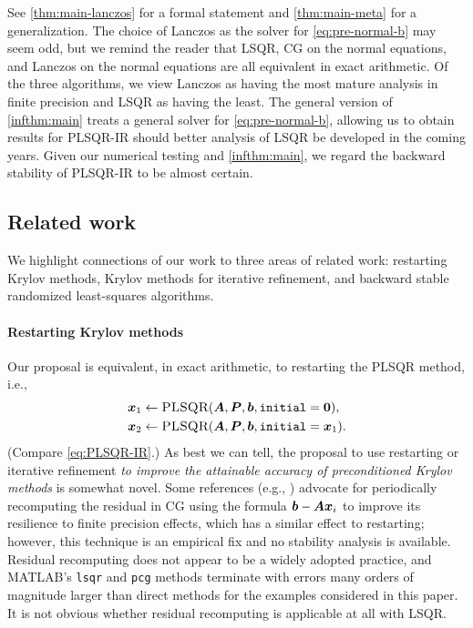 \documentclass[onefignum,onetabnum,pagebackref,dvipsnames]{siamart220329}
\begin{document}
See \cref{thm:main-lanczos} for a formal statement and \cref{thm:main-meta} for a generalization.
The choice of Lanczos as the solver for \cref{eq:pre-normal-b} may seem odd, but we remind the reader that LSQR, CG on the normal equations, and Lanczos on the normal equations are all equivalent in exact arithmetic.
Of the three algorithms, we view Lanczos as having the most mature analysis in finite precision and LSQR as having the least.
The general version of \cref{infthm:main} treats a general solver for \cref{eq:pre-normal-b}, allowing us to obtain results for PLSQR-IR should better analysis of LSQR be developed in the coming years.
Given our numerical testing and \cref{infthm:main}, we regard the backward stability of PLSQR-IR to be almost certain.


\subsection{Related work}
We highlight connections of our work to three areas of related work: restarting Krylov methods, Krylov methods for iterative refinement, and backward stable randomized least-squares algorithms.

\paragraph{Restarting Krylov methods}
Our proposal is equivalent, in exact arithmetic, to restarting the PLSQR method, i.e.,
%
\begin{equation} \label{eq:LSQR-restarting}
    \begin{split}
    \vec{x}_1 &\gets \Call{PLSQR}{\mat{A},\mat{P},\vec{b},\texttt{initial}=\vec{0}}, \\
    \vec{x}_2 &\gets \Call{PLSQR}{\mat{A},\mat{P},\vec{b},\texttt{initial}=\vec{x}_1}.
    \end{split}
\end{equation}
%
(Compare \cref{eq:PLSQR-IR}.)
As best we can tell, the proposal to use restarting or iterative refinement \emph{to improve the attainable accuracy of preconditioned Krylov methods} is somewhat novel.
Some references (e.g., \cite[p.~49]{She94a}) advocate for periodically recomputing the residual in CG using the formula $\boldsymbol{b} - \boldsymbol{A}\boldsymbol{x}_i$ to improve its resilience to finite precision effects, which has a similar effect to restarting; however, this technique is an empirical fix and no stability analysis is available.
Residual recomputing does not appear to be a widely adopted practice, and MATLAB's \texttt{lsqr} and \texttt{pcg} methods terminate with errors many orders of magnitude larger than direct methods for the examples considered in this paper.
It is not obvious whether residual recomputing is applicable at all with LSQR.
\end{document}
